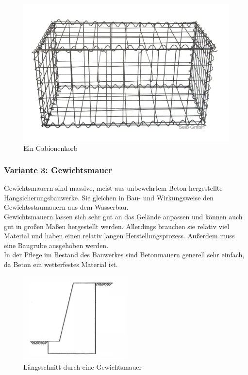 \documentclass[11pt,fleqn,a4paper]{article}
\begin{document}
\begin{figure}[h!]
\includegraphics[scale=0.2]{gabione.jpg}
\caption{Ein Gabionenkorb \cite{gabio2}}
\end{figure}
\newpage
\subsubsection*{Variante 3: Gewichtsmauer}
Gewichtsmauern sind massive, meist aus unbewehrtem Beton hergestellte Hangsicherungsbauwerke. Sie gleichen in Bau- und Wirkungsweise den Gewichtsstaumauern aus dem Wasserbau. \\
Gewichtsmauern lassen sich sehr gut an das Gelände anpassen und können auch gut in großen Maßen hergestellt werden. Allerdings brauchen sie relativ viel Material und haben einen relativ langen Herstellungsprozess. Außerdem muss eine Baugrube ausgehoben werden. \\
In der Pflege im Bestand des Bauwerkes sind Betonmauern generell sehr einfach, da Beton ein wetterfestes Material ist.
\begin{figure}[h!]
\includegraphics[scale=0.8]{gewichtsmauer.png}
\caption{Längsschnitt durch eine Gewichtsmauer \cite[11.63]{gewichtsmauer}}
\end{figure}
\end{document}
